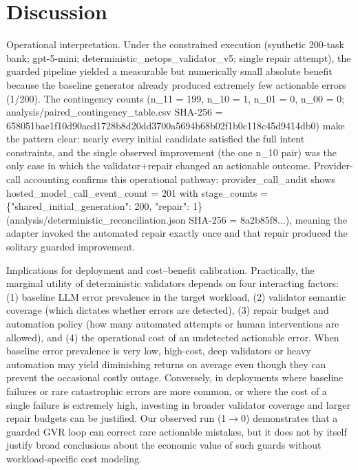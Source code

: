 \documentclass[conference]{IEEEtran}
\begin{document}
\section{Discussion}
Operational interpretation. Under the constrained execution (synthetic 200-task bank; gpt-5-mini; deterministic\_netops\_validator\_v5; single repair attempt), the guarded pipeline yielded a measurable but numerically small absolute benefit because the baseline generator already produced extremely few actionable errors (1/200). The contingency counts (n\_11 = 199, n\_10 = 1, n\_01 = 0, n\_00 = 0; analysis/paired\_contingency\_table.csv SHA-256 = 658051bae1f10d90aed1728b8d20dd3700a5694b68b02f1b0c118c45d9414db0) make the pattern clear: nearly every initial candidate satisfied the full intent constraints, and the single observed improvement (the one n\_10 pair) was the only case in which the validator+repair changed an actionable outcome. Provider-call accounting confirms this operational pathway: provider\_call\_audit shows hosted\_model\_call\_event\_count = 201 with stage\_counts = \{"shared\_initial\_generation": 200, "repair": 1\} (analysis/deterministic\_reconciliation.json SHA-256 = 8a2b85f8...), meaning the adapter invoked the automated repair exactly once and that repair produced the solitary guarded improvement.

Implications for deployment and cost--benefit calibration. Practically, the marginal utility of deterministic validators depends on four interacting factors: (1) baseline LLM error prevalence in the target workload, (2) validator semantic coverage (which dictates whether errors are detected), (3) repair budget and automation policy (how many automated attempts or human interventions are allowed), and (4) the operational cost of an undetected actionable error. When baseline error prevalence is very low, high-cost, deep validators or heavy automation may yield diminishing returns on average even though they can prevent the occasional costly outage. Conversely, in deployments where baseline failures or rare catastrophic errors are more common, or where the cost of a single failure is extremely high, investing in broader validator coverage and larger repair budgets can be justified. Our observed run (1\ensuremath{\rightarrow}0) demonstrates that a guarded GVR loop can correct rare actionable mistakes, but it does not by itself justify broad conclusions about the economic value of such guards without workload-specific cost modeling.
\end{document}
